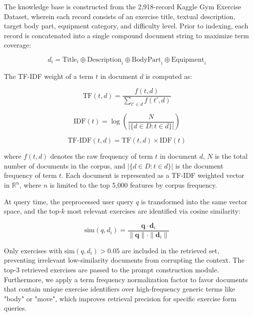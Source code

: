 \documentclass[conference]{IEEEtran}
\begin{document}
The knowledge base is constructed from the 2,918-record Kaggle Gym Exercise Dataset, wherein each record consists of an exercise title, textual description, target body part, equipment category, and difficulty level. Prior to indexing, each record is concatenated into a single compound document string to maximize term coverage:

\begin{equation}
d_i = \text{Title}_i \oplus \text{Description}_i \oplus \text{BodyPart}_i \oplus \text{Equipment}_i
\label{eq:concat}
\end{equation}

The TF-IDF weight of a term $t$ in document $d$ is computed as:

\begin{equation}
\text{TF}(t, d) = \frac{f(t, d)}{\sum_{t' \in d} f(t', d)}
\label{eq:tf}
\end{equation}

\begin{equation}
\text{IDF}(t) = \log\left(\frac{N}{|\{d \in D : t \in d\}|}\right)
\label{eq:idf}
\end{equation}

\begin{equation}
\text{TF-IDF}(t, d) = \text{TF}(t, d) \times \text{IDF}(t)
\label{eq:tfidf}
\end{equation}

where $f(t, d)$ denotes the raw frequency of term $t$ in document $d$, $N$ is the total number of documents in the corpus, and $|\{d \in D : t \in d\}|$ is the document frequency of term $t$. Each document is represented as a TF-IDF weighted vector in $\mathbb{R}^n$, where $n$ is limited to the top 5,000 features by corpus frequency.

At query time, the preprocessed user query $q$ is transformed into the same vector space, and the top-$k$ most relevant exercises are identified via cosine similarity:

\begin{equation}
\text{sim}(q, d_i) = \frac{\mathbf{q} \cdot \mathbf{d}_i}{\|\mathbf{q}\| \cdot \|\mathbf{d}_i\|}
\label{eq:cosine}
\end{equation}

Only exercises with $\text{sim}(q, d_i) > 0.05$ are included in the retrieved set, preventing irrelevant low-similarity documents from corrupting the context. The top-3 retrieved exercises are passed to the prompt construction module. Furthermore, we apply a term frequency normalization factor to favor documents that contain unique exercise identifiers over high-frequency generic terms like "body" or "move", which improves retrieval precision for specific exercise form queries.
\end{document}
